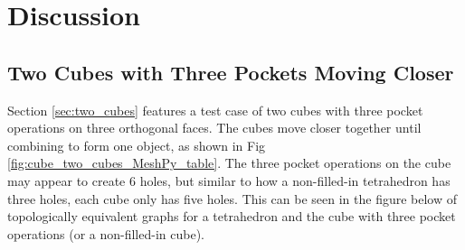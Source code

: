 \documentclass[ma]{uncgdissertationexp}
\theoremstyle{plain}
\theoremstyle{definition}
\theoremstyle{remark}
\begin{document}
\chapter{Discussion}
\label{chap:discussion}
\section{Two Cubes with Three Pockets Moving Closer}
\label{sec:two_cubes_discussion}
\par Section \ref{sec:two_cubes} features a test case of two cubes with three pocket operations on three orthogonal faces. The cubes move closer together until combining to form one object, as shown in Fig \ref{fig:cube_two_cubes_MeshPy_table}. The three pocket operations on the cube may appear to create 6 holes, but similar to how a non-filled-in tetrahedron has three holes, each cube only has five holes. This can be seen in the figure below of topologically equivalent graphs for a tetrahedron and the cube with three pocket operations (or a non-filled-in cube).
\end{document}
